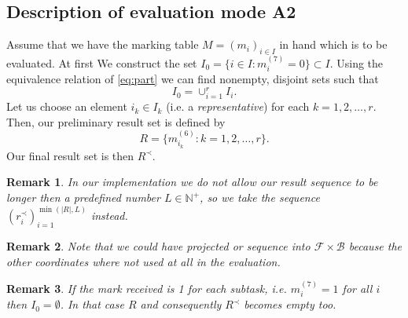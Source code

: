 \documentclass{scrartcl}
\newtheorem{remark}{Remark}
\begin{document}
\subsection{Description of evaluation mode A2}
Assume that we have the marking table $M=(m_i)_{i\in I}$ in hand which is to be evaluated. At first We construct the set $I_0=\{i\in I: m_i^{(7)}=0\}\subset I$. Using the equivalence relation of \ref{eq:part} we can find nonempty, disjoint sets such that $$I_0=\cup_{i=1}^rI_i.$$ Let us choose an element $i_k\in I_k$ (i.e. a \emph{representative}) for each $k=1,2,\ldots,r$. Then, our preliminary result set is defined by
$$R=\{m^{(6)}_{i_k}:k=1,2,\ldots,r\}.$$
Our final result set is then $R^{\prec}$.
\begin{remark}
In our implementation we do not allow our result sequence to be longer then a predefined number $L\in\mathbb{N}^+$, so we take the sequence $(r^{\prec}_i)_{i=1}^{\min(|R|,L)}$ instead.    
\end{remark}
\begin{remark}
Note that we could have projected or sequence into $\mathcal{F}\times\mathcal{B}$ because the other coordinates where not used at all in the evaluation.
\end{remark}
\begin{remark}
If the mark received is 1 for each subtask, i.e. $m^{(7)}_i=1$ for all $i$ then $I_0=\emptyset$. In that case $R$ and consequently $R^{\prec}$ becomes empty too.
\end{remark}
\end{document}
